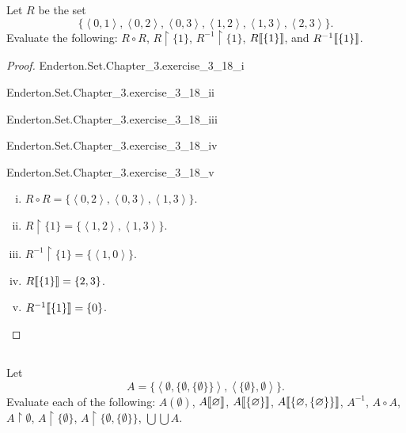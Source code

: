 \documentclass{report}
\newcommand{\pair}[1]{\left< #1 \right>}
\begin{document}
\subsection{}%

Let $R$ be the set
  $$\{ \pair{0, 1}, \pair{0, 2}, \pair{0, 3},
       \pair{1, 2}, \pair{1, 3}, \pair{2, 3}\}.$$
Evaluate the following: $R \circ R$, $R \restriction \{1\}$,
  $R^{-1} \restriction \{1\}$, $R\!\left\llbracket\{1\}\right\rrbracket$, and $R^{-1}\!\left\llbracket\{1\}\right\rrbracket$.

\begin{proof}

  \statementpadding

    {Enderton.Set.Chapter\_3.exercise\_3\_18\_i}

    {Enderton.Set.Chapter\_3.exercise\_3\_18\_ii}

    {Enderton.Set.Chapter\_3.exercise\_3\_18\_iii}

    {Enderton.Set.Chapter\_3.exercise\_3\_18\_iv}

    {Enderton.Set.Chapter\_3.exercise\_3\_18\_v}

  \begin{enumerate}[(i)]
    \item $R \circ R = \{ \pair{0, 2}, \pair{0, 3}, \pair{1, 3} \}$.
    \item $R \restriction \{1\} = \{ \pair{1, 2}, \pair{1, 3} \}$.
    \item $R^{-1} \restriction \{1\} = \{\pair{1, 0}\}$.
    \item $R\!\left\llbracket\{1\}\right\rrbracket = \{2, 3\}$.
    \item $R^{-1}\!\left\llbracket\{1\}\right\rrbracket = \{0\}$.
  \end{enumerate}

\end{proof}

\subsection{}%

Let $$A = \{
  \pair{\emptyset, \{\emptyset, \{\emptyset\}\}},
  \pair{\{\emptyset\}, \emptyset}
  \}.$$
Evaluate each of the following: $A(\emptyset)$, $A\!\left\llbracket\varnothing\right\rrbracket$,
  $A\!\left\llbracket\{\varnothing\}\right\rrbracket$, $A\!\left\llbracket\{\varnothing, \{\varnothing\}\}\right\rrbracket$,
  $A^{-1}$, $A \circ A$, $A \restriction \emptyset$,
  $A \restriction \{\emptyset\}$, $A \restriction \{\emptyset, \{\emptyset\}\}$,
  $\bigcup\bigcup A$.
\end{document}
